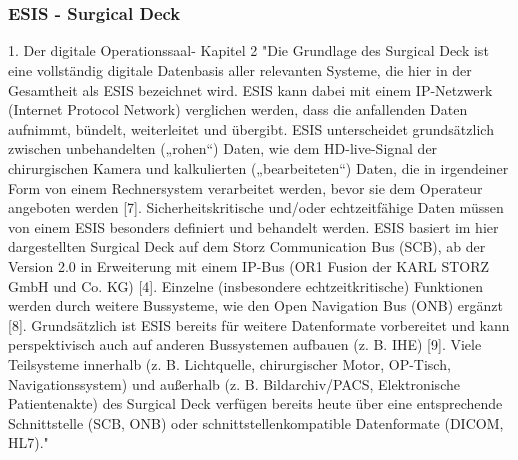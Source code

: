 \chapter{}
\label{sec:overview}

\subsection{ESIS - Surgical Deck}
1. Der digitale Operationssaal- Kapitel 2
	"Die Grundlage des Surgical Deck ist eine vollständig digitale Datenbasis aller relevanten
	Systeme, die hier in der Gesamtheit als ESIS bezeichnet wird. ESIS kann dabei mit
	einem IP-Netzwerk (Internet Protocol Network) verglichen werden, dass die anfallenden
	Daten aufnimmt, bündelt, weiterleitet und übergibt. ESIS unterscheidet grundsätzlich
	zwischen unbehandelten („rohen“) Daten, wie dem HD-live-Signal der chirurgischen
	Kamera und kalkulierten („bearbeiteten“) Daten, die in irgendeiner Form
	von einem Rechnersystem verarbeitet werden, bevor sie dem Operateur angeboten
	werden [7]. Sicherheitskritische und/oder echtzeitfähige Daten müssen von einem
	ESIS besonders definiert und behandelt werden. ESIS basiert im hier dargestellten
	Surgical Deck auf dem Storz Communication Bus (SCB), ab der Version 2.0 in Erweiterung
	mit einem IP-Bus (OR1 Fusion der KARL STORZ GmbH und Co. KG) [4]. Einzelne
	(insbesondere echtzeitkritische) Funktionen werden durch weitere Bussysteme, wie
	den Open Navigation Bus (ONB) ergänzt [8]. Grundsätzlich ist ESIS bereits für weitere
	Datenformate vorbereitet und kann perspektivisch auch auf anderen Bussystemen
	aufbauen (z. B. IHE) [9]. Viele Teilsysteme innerhalb (z. B. Lichtquelle, chirurgischer
	Motor, OP-Tisch, Navigationssystem) und außerhalb (z. B. Bildarchiv/PACS, Elektronische
	Patientenakte) des Surgical Deck verfügen bereits heute über eine entsprechende
	Schnittstelle (SCB, ONB) oder schnittstellenkompatible Datenformate (DICOM, HL7)."

